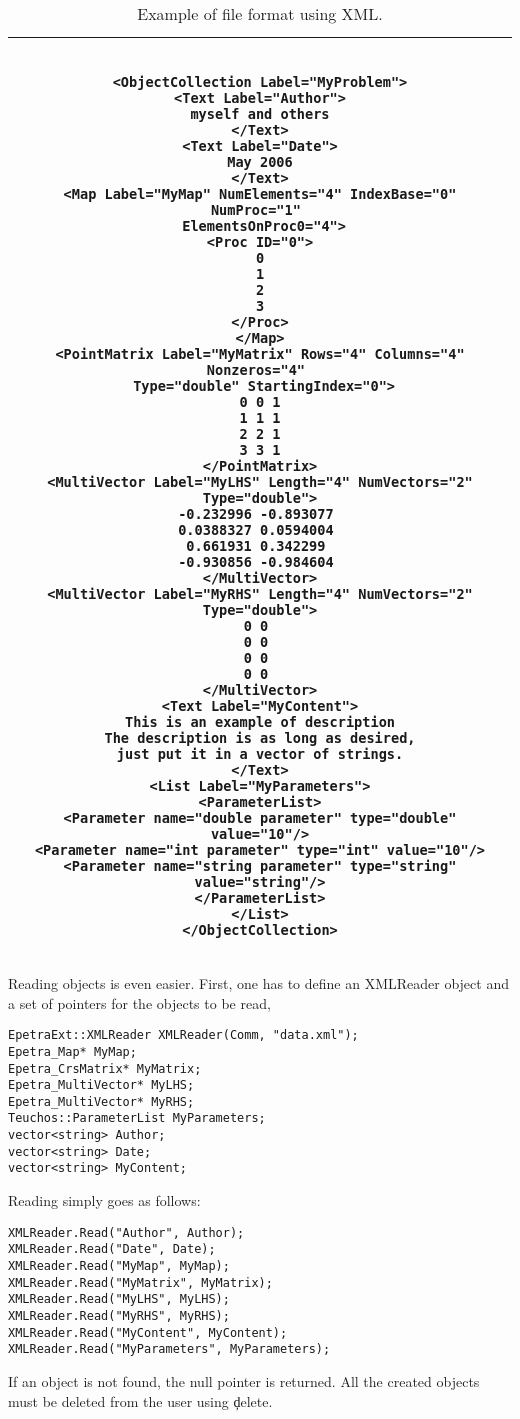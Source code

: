 \documentclass[11pt,relax]{SANDreport}
\begin{document}
\begin{table}
\begin{tabular}{| c |}
\hline
\small
\begin{minipage}{16cm}
\begin{verbatim}

<ObjectCollection Label="MyProblem">
<Text Label="Author">
myself and others
</Text>
<Text Label="Date">
May 2006
</Text>
<Map Label="MyMap" NumElements="4" IndexBase="0" NumProc="1" 
 ElementsOnProc0="4">
<Proc ID="0">
0
1
2
3
</Proc>
</Map>
<PointMatrix Label="MyMatrix" Rows="4" Columns="4" Nonzeros="4" 
 Type="double" StartingIndex="0">
0 0 1
1 1 1
2 2 1
3 3 1
</PointMatrix>
<MultiVector Label="MyLHS" Length="4" NumVectors="2" Type="double">
-0.232996 -0.893077 
0.0388327 0.0594004 
0.661931 0.342299 
-0.930856 -0.984604 
</MultiVector>
<MultiVector Label="MyRHS" Length="4" NumVectors="2" Type="double">
0 0 
0 0 
0 0 
0 0 
</MultiVector>
<Text Label="MyContent">
This is an example of description
The description is as long as desired,
just put it in a vector of strings.
</Text>
<List Label="MyParameters">
<ParameterList>
<Parameter name="double parameter" type="double" value="10"/>
<Parameter name="int parameter" type="int" value="10"/>
<Parameter name="string parameter" type="string" value="string"/>
</ParameterList>
</List>
</ObjectCollection>

\end{verbatim}
\end{minipage} \\
\hline
\end{tabular}
\caption{Example of file format using XML.}
\label{fig:xml}
\end{table}

Reading objects is even easier. First, one has to define an XMLReader object
and a set of pointers for the objects to be read,
\begin{verbatim}
EpetraExt::XMLReader XMLReader(Comm, "data.xml");
Epetra_Map* MyMap;
Epetra_CrsMatrix* MyMatrix;
Epetra_MultiVector* MyLHS;
Epetra_MultiVector* MyRHS;
Teuchos::ParameterList MyParameters;
vector<string> Author;
vector<string> Date;
vector<string> MyContent;
\end{verbatim}
Reading simply goes as follows:
\begin{verbatim}
XMLReader.Read("Author", Author);
XMLReader.Read("Date", Date);
XMLReader.Read("MyMap", MyMap);
XMLReader.Read("MyMatrix", MyMatrix);
XMLReader.Read("MyLHS", MyLHS);
XMLReader.Read("MyRHS", MyRHS);
XMLReader.Read("MyContent", MyContent);
XMLReader.Read("MyParameters", MyParameters);
\end{verbatim} 
If an object is not found, the null pointer is returned.
All the created objects must be deleted from the user using \c delete. 
\end{document}
